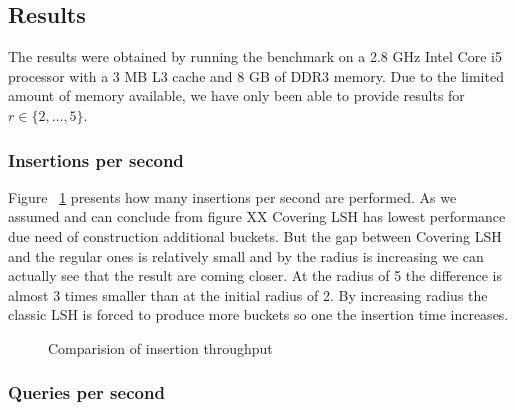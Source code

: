 \subsection{Results}

The results were obtained by running the benchmark on a 2.8 GHz Intel Core i5 processor with a 3 MB L3 cache and 8 GB of DDR3 memory. Due to the limited amount of memory available, we have only been able to provide results for $r \in \{2,\ldots,5\}$.

\subsubsection{Insertions per second}

Figure ~\ref{fig:insertions-per-second} presents how many insertions per second are performed. As we assumed and can conclude from figure XX  Covering LSH has lowest performance due need of construction additional buckets. But the gap between Covering LSH and the regular ones is relatively small and by the radius is increasing we can actually see that the result are coming closer. At the radius of 5 the difference is almost 3 times smaller than at the initial radius of 2. By increasing radius the classic LSH is forced to produce more buckets so one the insertion time increases.

\begin{figure}[ht]

  \caption{Comparision of insertion throughput}
  \label{fig:insertions-per-second}
\end{figure}

\subsubsection{Queries per second}

